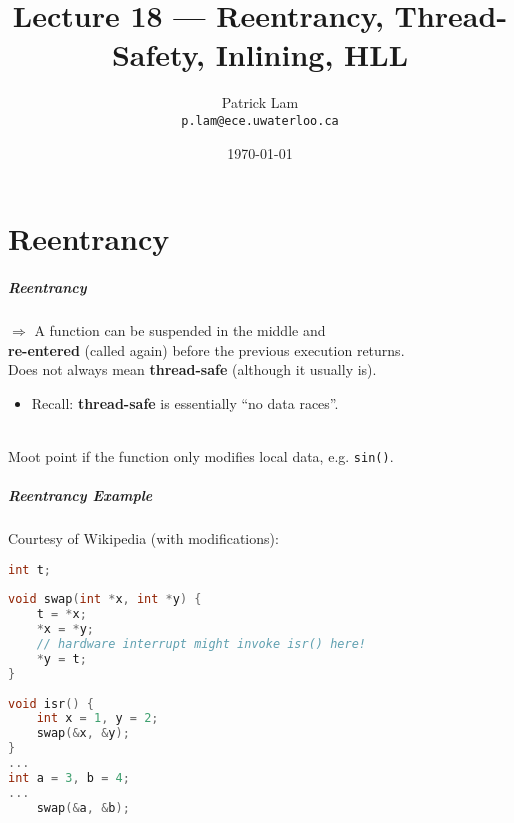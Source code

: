 

\title{Lecture 18 --- Reentrancy, Thread-Safety, Inlining, HLL }

\author{Patrick Lam \\ \small \texttt{p.lam@ece.uwaterloo.ca}}
\date{\today}




\begin{frame}
  \titlepage

 \end{frame}


\part{Reentrancy}
\frame{\partpage}

\begin{frame}
  \frametitle{Reentrancy}

  
    $\Rightarrow$ A function can be suspended in the middle and \\ {\bf re-entered}
      (called again) before the previous execution returns.\\[1em]
    
     Does not always mean {\bf thread-safe} (although it usually is).
      \begin{itemize}
        \item Recall: {\bf thread-safe} is essentially ``no data races''.
      \end{itemize}
 ~\\[1em]
  Moot point if the function only modifies local data, e.g. {\tt sin()}.
  
\end{frame}

\begin{frame}[fragile]
  \frametitle{Reentrancy Example}

  

  Courtesy of Wikipedia (with modifications):
  \begin{lstlisting}[language=C]
int t;
 
void swap(int *x, int *y) {
    t = *x;
    *x = *y;
    // hardware interrupt might invoke isr() here!
    *y = t;
}
 
void isr() {
    int x = 1, y = 2;
    swap(&x, &y);
}
...
int a = 3, b = 4;
...
    swap(&a, &b);
  \end{lstlisting}
  
\end{frame}

